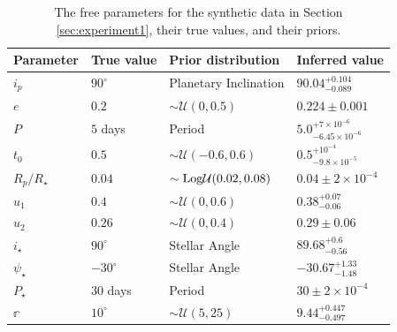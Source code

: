 \documentclass[twocolumn]{aastex631}
\begin{document}
%
\begin{table}[]
    \vspace{0.5cm}
    \centering
    \caption{The free parameters for the synthetic data in Section \ref{sec:experiment1}, their true values, and their priors.}
    \begin{tabular}{llll}
    \hline
    Parameter                                 & True value            & Prior distribution                   & Inferred value    \\ \hline\hline
    $i_p$                                     & $90^\circ$            & Planetary Inclination                & $90.04^{+0.104}_{-0.089}$                   \\
    $e$                                       & $0.2$                 & $\sim\mathcal{U}(0, 0.5)$            & $0.224 \pm 0.001$                     \\
    $P$                                       & $5$ days              & Period                               & $5.0^{+7\times10^{-6}}_{-6.45\times10^{-6}}$                       \\
    $t_0$                                     & $0.5$                 & $\sim\mathcal{U}(-0.6, 0.6)$         & $0.5^{+10^{-4}}_{-9.8\times10^{-5}}$                       \\
    $R_p / R_\star$                           & $0.04$                & $\sim \rm Log \mathcal{U}(0.02, 0.08)$ & $0.04 \pm 2\times10^{-4}$                         \\ 
    $u_1$                                     & $0.4$                 & $\sim\mathcal{U}(0, 0.6)$            & $0.38^{+0.07}_{-0.06}$                         \\ 
    $u_2$                                     & $0.26$                & $\sim\mathcal{U}(0, 0.4)$            & $0.29 \pm 0.06$                         \\ \hline
    $i_\star$                                 & $90^\circ$            & Stellar Angle                        & $89.68^{+0.6}_{-0.56}$                      \\
    $\psi_\star$                           & $-30^\circ$           & Stellar Angle                        & $-30.67^{+1.33}_{-1.48}$                           \\
    $P_\star$                                 & $30$ days             & Period                               & $30\pm 2 \times10^{-4}$                       \\ \hline
    $\mathbb{r}$                              & $10^\circ$            & $\sim\mathcal{U}(5, 25)$             & $9.44^{+0.447}_{-0.497}$                           \\

\end{tabular}
\end{table}
\end{document}
